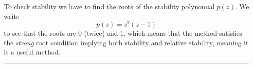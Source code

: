 \documentclass[10pt]{article}
\begin{document}
\begin{enumerate}
  To check stability we have to find the roots of the stability
  polynomial $p(z)$. We write
  \begin{equation*}
    p(z) = z^2 (z - 1)
  \end{equation*}
  to see that the roots are 0 (twice) and 1, which means that the
  method satisfies the \emph{strong} root condition implying both
  stability and relative stability, meaning it is a useful method. 
  \begin{center}
    \rule{0.9\textwidth}{.1pt}
  \end{center}
\end{enumerate}
\end{document}
